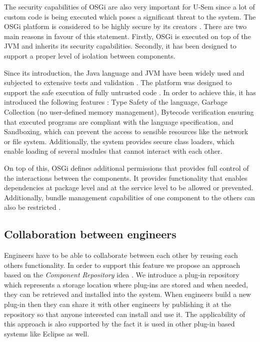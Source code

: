 The security capabilities of OSGi are also very important for U-Sem since a lot of custom code is being executed which poses a significant threat to the system. The OSGi platform is considered to be highly secure by its creators \cite{parrend2009security}. There are two main reasons in favour of this statement. Firstly, OSGi is executed on top of the JVM and inherits its security capabilities. Secondly, it has been designed to support a proper level of isolation between components.

Since its introduction, the Java language and JVM have been widely used and subjected to extensive tests and validation \cite{parrend2009security}. The platform was designed to support the safe execution of fully untrusted code \cite{dean1996java}. In order to achieve this, it has introduced the following features \cite{gong2003inside}: Type Safety of the language, Garbage Collection (no user-defined memory management), Bytecode verification ensuring that executed programs are compliant with the language specification, and Sandboxing, which can prevent the access to sensible resources like the network or file system. Additionally, the system provides secure class loaders, which enable loading of several modules that cannot interact with each other.

On top of this, OSGi defines additional permissions that provides full control of the interactions between the components. It provides functionality that enables dependencies at package level and at the service level to be allowed or prevented. Additionally, bundle management capabilities of one component to the others can also be restricted \cite{parrend2009security}.

\subsection{Collaboration between engineers}

Engineers have to be able to collaborate between each other by reusing each others functionality. In order to support this feature we propose an approach based on the \textit{Component Repository} idea \cite{seacord1999software}. We introduce a plug-in repository which represents a storage location where plug-ins are stored and when needed, they can be retrieved and installed into the system. When engineers build a new plug-in then they can share it with other engineers by publishing it at the repository so that anyone interested can install and use it. The applicability of this approach is also supported by the fact it is used in other plug-in based systems like Eclipse \cite{mcaffer2010eclipse} as well.

